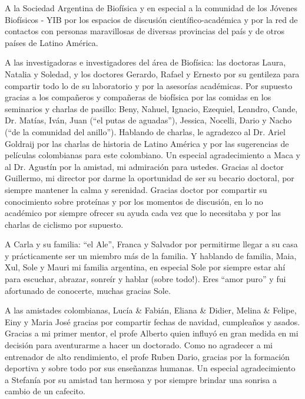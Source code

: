 A la Sociedad Argentina de Biofísica y en especial a la comunidad de los Jóvenes Biofísicos - YIB por los espacios de discusión científico-académica y por la red de contactos con personas maravillosas de diversas provincias del país y de otros países de Latino América.\\\vspace{-0.6cm}

A las investigadoras e investigadores del área de Biofísica: las  doctoras Laura, Natalia y Soledad, y los doctores Gerardo, Rafael y Ernesto por su gentileza para compartir todo lo de su laboratorio y por la asesorías académicas. Por supuesto gracias a los compañeros y compañeras de biofísica por las comidas en los seminarios y charlas de pasillo: Beny, Nahuel, Ignacio, Ezequiel, Leandro, Cande, Dr. Matías, Iván, Juan (``el putas de aguadas''), Jessica, Nocelli, Dario y Nacho (``de la comunidad del anillo''). Hablando de charlas, le agradezco al Dr. Ariel Goldraij por las charlas de historia de Latino América y por las sugerencias de películas colombianas para este colombiano. Un especial agradecimiento a Maca y al Dr. Agustín por la amistad, mi admiración para ustedes. Gracias al doctor Guillermo, mi director por darme la oportunidad de ser su becario doctoral, por siempre mantener la calma y serenidad. Gracias doctor por compartir su conocimiento sobre proteínas y por los momentos de discusión, en lo no académico por siempre ofrecer su ayuda cada vez que lo necesitaba y por las charlas de ciclismo por supuesto. \\\vspace{-0.6cm}

A Carla y su familia: ``el Ale'', Franca y Salvador por permitirme llegar a su casa y prácticamente ser un miembro más de la familia. Y hablando de familia, Maia, Xul, Sole y Mauri mi familia argentina, en especial Sole por siempre estar ahí para escuchar, abrazar, sonreír y hablar (\textexclamdown sobre todo!). Eres ``amor puro'' y fui afortunado de conocerte, muchas gracias Sole.\\\vspace{-0.6cm}

A las amistades colombianas, Lucía \& Fabián, Eliana \& Didier, Melina \& Felipe, Einy y Maria José gracias por compartir fechas de navidad, cumpleaños y asados. Gracias a mi primer mentor, el profe Alberto quien influyó en gran medida en mi decisión para aventurarme a hacer un doctorado. Como no agradecer a mi entrenador de alto rendimiento, el profe Ruben Dario, gracias por la formación deportiva y sobre todo por sus enseñanzas humanas. Un especial agradecimiento a Stefanía por su amistad tan hermosa y por siempre brindar una sonrisa a cambio de un cafecito.\\\vspace{-0.6cm}

